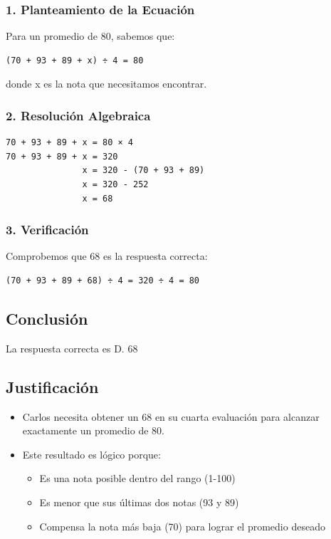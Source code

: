 \documentclass[
]{article}
\providecommand{\tightlist}{%
  \setlength{\itemsep}{0pt}\setlength{\parskip}{0pt}}
\begin{document}
\subsubsection{1. Planteamiento de la
Ecuación}\label{planteamiento-de-la-ecuaciuxf3n}

Para un promedio de 80, sabemos que:

\begin{verbatim}
(70 + 93 + 89 + x) ÷ 4 = 80
\end{verbatim}

donde x es la nota que necesitamos encontrar.

\subsubsection{2. Resolución Algebraica}\label{resoluciuxf3n-algebraica}

\begin{verbatim}
70 + 93 + 89 + x = 80 × 4
70 + 93 + 89 + x = 320
               x = 320 - (70 + 93 + 89)
               x = 320 - 252
               x = 68
\end{verbatim}

\subsubsection{3. Verificación}\label{verificaciuxf3n-1}

Comprobemos que 68 es la respuesta correcta:

\begin{verbatim}
(70 + 93 + 89 + 68) ÷ 4 = 320 ÷ 4 = 80
\end{verbatim}

\subsection{Conclusión}\label{conclusiuxf3n-6}

La respuesta correcta es D. 68

\subsection{Justificación}\label{justificaciuxf3n-3}

\begin{itemize}
\tightlist
\item
  Carlos necesita obtener un 68 en su cuarta evaluación para alcanzar
  exactamente un promedio de 80.
\item
  Este resultado es lógico porque:

  \begin{itemize}
  \tightlist
  \item
    Es una nota posible dentro del rango (1-100)
  \item
    Es menor que sus últimas dos notas (93 y 89)
  \item
    Compensa la nota más baja (70) para lograr el promedio deseado
  \end{itemize}
\end{itemize}
\end{document}
